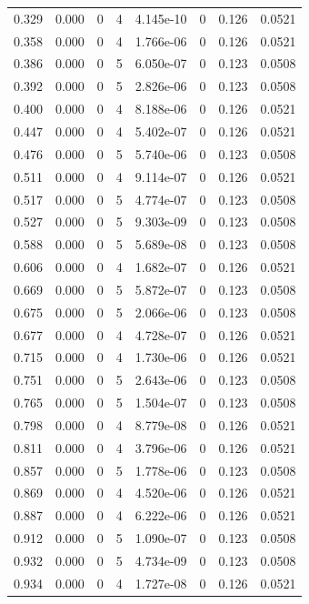 \documentclass[preview]{standalone}
\begin{document}
{{\begin{tabular}{L{1.2cm}C{1.2cm} C{0.3cm}C{0.5cm} C{1.4cm}C{1.4cm} C{1.4cm}C{1.4cm}}
  0.329  &  0.000  & 0     &  4 &  4.145e-10  & 0  & 0.126 &  0.0521   \\ 
  0.358  &  0.000  & 0     &  4 &  1.766e-06  & 0  & 0.126 &  0.0521   \\ 
  0.386  &  0.000  & 0     &  5 &  6.050e-07  & 0  & 0.123 &  0.0508   \\ 
  0.392  &  0.000  & 0     &  5 &  2.826e-06  & 0  & 0.123 &  0.0508   \\ 
  0.400  &  0.000  & 0     &  4 &  8.188e-06  & 0  & 0.126 &  0.0521   \\ 
  0.447  &  0.000  & 0     &  4 &  5.402e-07  & 0  & 0.126 &  0.0521   \\ 
  0.476  &  0.000  & 0     &  5 &  5.740e-06  & 0  & 0.123 &  0.0508   \\ 
  0.511  &  0.000  & 0     &  4 &  9.114e-07  & 0  & 0.126 &  0.0521   \\ 
  0.517  &  0.000  & 0     &  5 &  4.774e-07  & 0  & 0.123 &  0.0508   \\ 
  0.527  &  0.000  & 0     &  5 &  9.303e-09  & 0  & 0.123 &  0.0508   \\ 
  0.588  &  0.000  & 0     &  5 &  5.689e-08  & 0  & 0.123 &  0.0508   \\ 
  0.606  &  0.000  & 0     &  4 &  1.682e-07  & 0  & 0.126 &  0.0521   \\ 
  0.669  &  0.000  & 0     &  5 &  5.872e-07  & 0  & 0.123 &  0.0508   \\ 
  0.675  &  0.000  & 0     &  5 &  2.066e-06  & 0  & 0.123 &  0.0508   \\ 
  0.677  &  0.000  & 0     &  4 &  4.728e-07  & 0  & 0.126 &  0.0521   \\ 
  0.715  &  0.000  & 0     &  4 &  1.730e-06  & 0  & 0.126 &  0.0521   \\ 
  0.751  &  0.000  & 0     &  5 &  2.643e-06  & 0  & 0.123 &  0.0508   \\ 
  0.765  &  0.000  & 0     &  5 &  1.504e-07  & 0  & 0.123 &  0.0508   \\ 
  0.798  &  0.000  & 0     &  4 &  8.779e-08  & 0  & 0.126 &  0.0521   \\ 
  0.811  &  0.000  & 0     &  4 &  3.796e-06  & 0  & 0.126 &  0.0521   \\ 
  0.857  &  0.000  & 0     &  5 &  1.778e-06  & 0  & 0.123 &  0.0508   \\ 
  0.869  &  0.000  & 0     &  4 &  4.520e-06  & 0  & 0.126 &  0.0521   \\ 
  0.887  &  0.000  & 0     &  4 &  6.222e-06  & 0  & 0.126 &  0.0521   \\ 
  0.912  &  0.000  & 0     &  5 &  1.090e-07  & 0  & 0.123 &  0.0508   \\ 
  0.932  &  0.000  & 0     &  5 &  4.734e-09  & 0  & 0.123 &  0.0508   \\ 
  0.934  &  0.000  & 0     &  4 &  1.727e-08  & 0  & 0.126 &  0.0521   \\ 
\hline 
\end{tabular} 

}}
\end{document}

